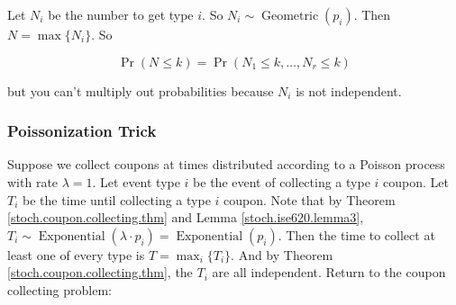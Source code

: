 \begin{example}
\begin{solution}
\end{solution}

\begin{solution}


Let \(N_i\) be the number to get type \(i\). So \(N_i \sim \operatorname{Geometric}(p_i)\). Then \(N = \max \{N_i \}\). So 

\[
\Pr(N \leq k) = \Pr(N_1 \leq k, \ldots, N_r \leq k) 
\]

but you can't multiply out probabilities because \(N_i\) is not independent. 

\end{solution}

%


\end{example}

\subsubsection{Poissonization Trick}

Suppose we collect coupons at times distributed according to a Poisson process with rate \(\lambda=1\). Let event type \(i\) be the event of collecting a type \(i\) coupon. Let \(T_i\) be the time until collecting a type \(i\) coupon. Note that by Theorem \ref{stoch.coupon.collecting.thm} and Lemma \ref{stoch.ise620.lemma3}, \(T_i \sim \operatorname{Exponential}(\lambda \cdot p_i) =\operatorname{Exponential}( p_i) \). Then the time to collect at least one of every type is \(T = \max_i \{ T_i\}\). And by Theorem \ref{stoch.coupon.collecting.thm}, the \(T_i\) are all independent. Return to the coupon collecting problem:

